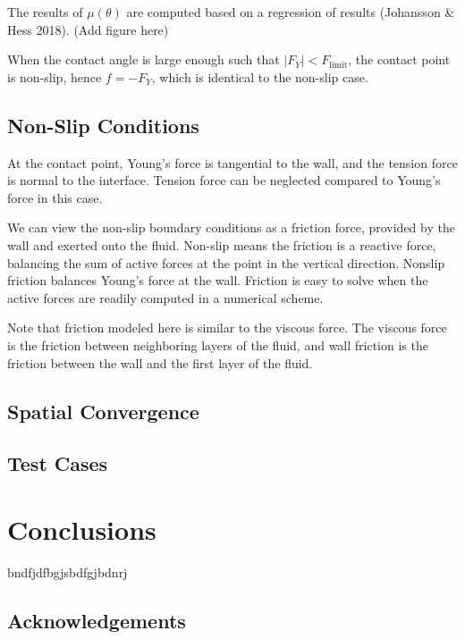 \documentclass{jfm}
\begin{document}
The results of $\mu(\theta)$ are computed based on a regression of results (Johansson \& Hess 2018). (Add figure here)

When the contact angle is large enough such that $|F_Y|<F_\text{limit}$, the contact point is non-slip, hence $f=-F_Y$, which is identical to the non-slip case.

\subsection{Non-Slip Conditions}\label{sec:results}

At the contact point, Young's force is tangential to the wall, and the tension force is normal to the interface. Tension force can be neglected compared to Young's force in this case.

We can view the non-slip boundary conditions as a friction force, provided by the wall and exerted onto the fluid. Non-slip means the friction is a reactive force, balancing the sum of active forces at the point in the vertical direction. Nonslip friction balances Young's force at the wall. Friction is easy to solve when the active forces are readily computed in a numerical scheme.

Note that friction modeled here is similar to the viscous force. The viscous force is the friction between neighboring layers of the fluid, and wall friction is the friction between the wall and the first layer of the fluid.

\subsection{Spatial Convergence}\label{sec:results}

\subsection{Test Cases}

\section{Conclusions\label{sec:conclusion}}


bndfjdfbgjsbdfgjbdnrj \cite{sun2020modeling} 
\subsection*{Acknowledgements} 


 
\end{document}
